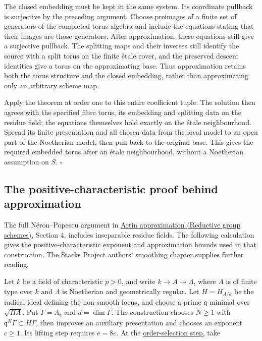 \documentclass[11pt,a4paper,openany]{report}
\begin{document}
The closed embedding must be kept in the same system. Its coordinate pullback is surjective by the preceding argument. Choose preimages of a finite set of generators of the completed torus algebra and include the equations stating that their images are those generators. After approximation, these equations still give a surjective pullback. The splitting maps and their inverses still identify the source with a split torus on the finite étale cover, and the preserved descent identities give a torus on the approximating base. Thus approximation retains both the torus structure and the closed embedding, rather than approximating only an arbitrary scheme map.

Apply the theorem at order one to this entire coefficient tuple. The solution then agrees with the specified fibre torus, its embedding and splitting data on the residue field; the equations themselves hold exactly on the étale neighbourhood. Spread its finite presentation and all chosen data from the local model to an open part of the Noetherian model, then pull back to the original base. This gives the required embedded torus after an étale neighbourhood, without a Noetherian assumption on \(S\). \(\square\)

\subsection{The positive-characteristic proof behind approximation}\label{AG-RG-01-the-positive-characteristic-proof-behind-approximation}

The full Néron--Popescu argument in \href{https://github.com/KokunoYumeto/open-math-courses/blob/main/docs/courses/AG-RG/AG-RG-S05.md}{Artin approximation (Reductive group schemes)}, Section 4, includes inseparable residue fields. The following calculation gives the positive-characteristic exponent and approximation bounds used in that construction. The Stacks Project authors' \href{https://github.com/KokunoYumeto/unofficial-stacks-project-ai-drafts/blob/565b10e987aba5969b21145a0833f42d69f96790/smoothing.tex}{smoothing chapter} supplies further reading.

Let \(k\) be a field of characteristic \(p>0\), and write \(k\to A\to\Lambda\), where \(A\) is of finite type over \(k\) and \(\Lambda\) is Noetherian and geometrically regular. Let \(H=H_{A/k}\) be the radical ideal defining the non-smooth locus, and choose a prime \(\mathfrak q\) minimal over \(\sqrt{H\Lambda}\). Put \(\Gamma=\Lambda_{\mathfrak q}\) and \(d=\dim\Gamma\). The construction chooses \(N\geq1\) with \(\mathfrak q^N\Gamma\subset H\Gamma\), then improves an auxiliary presentation and chooses an exponent \(c\geq1\). Its lifting step requires \(e=8c\). At the \href{https://github.com/KokunoYumeto/unofficial-stacks-project-ai-drafts/blob/565b10e987aba5969b21145a0833f42d69f96790/smoothing.tex\#L2687-L2730}{order-selection step}, take
\end{document}
